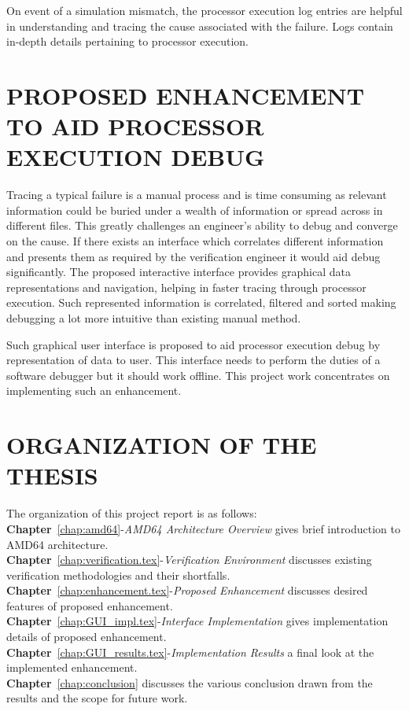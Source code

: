 On event of a simulation mismatch, the processor execution log entries are helpful in understanding and tracing the cause associated with the failure. Logs contain in-depth details pertaining to processor execution. 

\section{PROPOSED ENHANCEMENT TO AID PROCESSOR EXECUTION DEBUG}
Tracing a typical failure is a manual process and is time consuming as relevant information could be buried under a wealth of information or spread across in different files. This greatly challenges an engineer's ability to debug and converge on the cause. If there exists an interface which correlates different information and presents them as required by the verification engineer it would aid debug significantly. The proposed interactive interface provides graphical data representations and navigation, helping in faster tracing through processor execution. Such represented information is correlated, filtered and sorted making debugging a lot more intuitive than existing manual method.


Such graphical user interface is proposed to aid processor execution debug by representation of data to user. This interface needs to perform the duties of a software debugger but it should work offline. This project work concentrates on implementing such an enhancement.

 


\section{ORGANIZATION OF THE THESIS}
The organization of this project report is as follows:\\
\noindent 
{\bf Chapter}~\ref{chap:amd64}-{\it AMD64 Architecture Overview} gives brief introduction to AMD64 architecture.\\
{\bf Chapter}~\ref{chap:verification.tex}-{\it Verification Environment} discusses existing verification methodologies and their shortfalls.\\
{\bf Chapter}~\ref{chap:enhancement.tex}-{\it Proposed Enhancement} discusses desired features of proposed enhancement.\\
{\bf Chapter}~\ref{chap:GUI_impl.tex}-{\it Interface Implementation} gives implementation details of proposed enhancement.\\
{\bf Chapter}~\ref{chap:GUI_results.tex}-{\it Implementation Results} a final look at the implemented enhancement.\\
{\bf Chapter}~\ref{chap:conclusion} discusses the various conclusion drawn from the results and the scope for future work.

